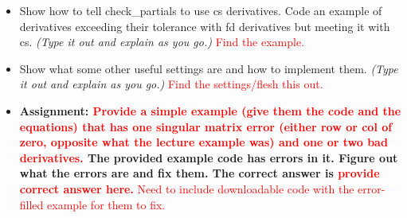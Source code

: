 \documentclass[12pt, letterpaper]{article}
\begin{document}
\begin{itemize}
\begin{itemize}
			\item Show how to tell check\_partials to use cs derivatives. Code an example of derivatives exceeding their tolerance with fd derivatives but meeting it with cs. \textit{(Type it out and explain as you go.)} \textcolor{red}{Find the example.}
			\item Show what some other useful settings are and how to implement them. \textit{(Type it out and explain as you go.)} \textcolor{red}{Find the settings/flesh this out.}
			\item \textbf{Assignment: \textcolor{red}{Provide a simple example (give them the code and the equations) that has one singular matrix error (either row or col of zero, opposite what the lecture example was) and one or two bad derivatives.} The provided example code has errors in it. Figure out what the errors are and fix them. The correct answer is \textcolor{red}{provide correct answer here.}} \textcolor{red}{Need to include downloadable code with the error-filled example for them to fix.}
		\end{itemize}
		

\end{itemize}
\end{document}
